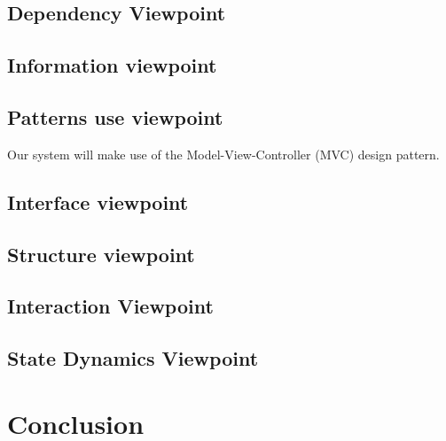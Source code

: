\documentclass[letterpaper,10pt,draftclsnofoot,onecolumn,titlepage]{IEEEtran}
\begin{document}
		\subsection{Dependency Viewpoint}

		\subsection{Information viewpoint}

		\subsection{Patterns use viewpoint}
			Our system will make use of the Model-View-Controller (MVC) design pattern.

		\subsection{Interface viewpoint}

		\subsection{Structure viewpoint}

		\subsection{Interaction Viewpoint}

		\subsection{State Dynamics Viewpoint}


	\section{Conclusion}
\end{document}
